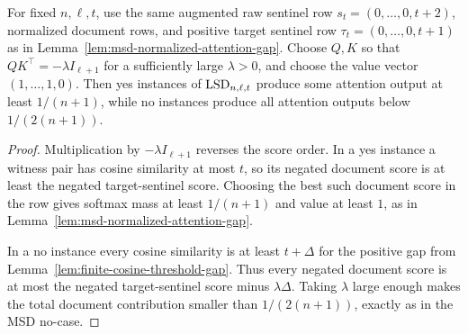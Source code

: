 \begin{lemma}
  \label{lem:lsd-normalized-attention-gap}
  For fixed $n,\ell,t$, use the same augmented raw sentinel row
  $s_t=(0,\ldots,0,t+2)$, normalized document rows, and positive target
  sentinel row $\tau_t=(0,\ldots,0,t+1)$ as in
  Lemma~\ref{lem:msd-normalized-attention-gap}.  Choose $Q,K$ so that
  $QK^\top=-\lambda I_{\ell+1}$ for a sufficiently large $\lambda>0$, and
  choose the value vector $(1,\ldots,1,0)$.  Then yes instances of
  $\mathrm{LSD}_{n,\ell,t}$ produce some attention output at least $1/(n+1)$, while no
  instances produce all attention outputs below $1/(2(n+1))$.
\end{lemma}
\begin{proof}
  Multiplication by $-\lambda I_{\ell+1}$ reverses the score order.  In a yes
  instance a witness pair has cosine similarity at most $t$, so its negated
  document score is at least the negated target-sentinel score.  Choosing the
  best such document score in the row gives softmax mass at least $1/(n+1)$
  and value at least $1$, as in
  Lemma~\ref{lem:msd-normalized-attention-gap}.

  In a no instance every cosine similarity is at least $t+\Delta$ for the
  positive gap from Lemma~\ref{lem:finite-cosine-threshold-gap}.  Thus every
  negated document score is at most the negated target-sentinel score minus
  $\lambda\Delta$.  Taking $\lambda$ large enough makes the total document
  contribution smaller than $1/(2(n+1))$, exactly as in the MSD no-case.
\end{proof}

